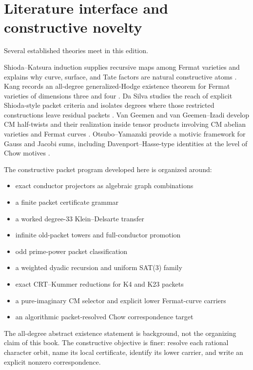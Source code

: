 \documentclass[11pt,oneside]{book}
\theoremstyle{definition}
\theoremstyle{remark}
\begin{document}
\chapter{Literature interface and constructive novelty}
Several established theories meet in this edition.

Shioda--Katsura induction supplies recursive maps among Fermat varieties and explains why curve, surface, and Tate factors are natural constructive atoms \cite{ShiodaKatsura}. Kang records an all-degree generalized-Hodge existence theorem for Fermat varieties of dimensions three and four \cite{KangFermat}. Da Silva studies the reach of explicit Shioda-style packet criteria and isolates degrees where those restricted constructions leave residual packets \cite{DaSilvaFermat}. Van Geemen and van Geemen--Izadi develop CM half-twists and their realization inside tensor products involving CM abelian varieties and Fermat curves \cite{VanGeemenHalfTwist,VanGeemenIzadi}. Otsubo--Yamazaki provide a motivic framework for Gauss and Jacobi sums, including Davenport--Hasse-type identities at the level of Chow motives \cite{OtsuboYamazaki}.

The constructive packet program developed here is organized around:
\begin{itemize}
\item exact conductor projectors as algebraic graph combinations
\item a finite packet certificate grammar
\item a worked degree-$33$ Klein--Delsarte transfer
\item infinite old-packet towers and full-conductor promotion
\item odd prime-power packet classification
\item a weighted dyadic recursion and uniform SAT(3) family
\item exact CRT--Kummer reductions for K4 and K23 packets
\item a pure-imaginary CM selector and explicit lower Fermat-curve carriers
\item an algorithmic packet-resolved Chow correspondence target
\end{itemize}

\begin{scopebox}
The all-degree abstract existence statement is background, not the organizing claim of this book. The constructive objective is finer: resolve each rational character orbit, name its local certificate, identify its lower carrier, and write an explicit nonzero correspondence.
\end{scopebox}
\end{document}
